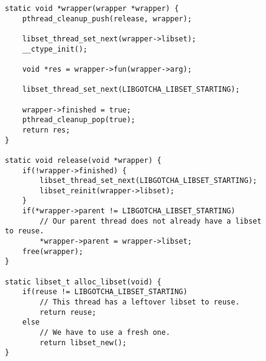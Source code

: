 \begin{figure}[p]
\begin{fullpage}
\begin{lstlisting}[label=lst:acsafe_helpers,caption=\textit{libac-safe}'s thread initializer and cleanup handler]
static void *wrapper(wrapper *wrapper) {
	pthread_cleanup_push(release, wrapper);

	libset_thread_set_next(wrapper->libset);
	__ctype_init();

	void *res = wrapper->fun(wrapper->arg);

	libset_thread_set_next(LIBGOTCHA_LIBSET_STARTING);

	wrapper->finished = true;
	pthread_cleanup_pop(true);
	return res;
}

static void release(void *wrapper) {
	if(!wrapper->finished) {
		libset_thread_set_next(LIBGOTCHA_LIBSET_STARTING);
		libset_reinit(wrapper->libset);
	}
	if(*wrapper->parent != LIBGOTCHA_LIBSET_STARTING)
		// Our parent thread does not already have a libset to reuse.
		*wrapper->parent = wrapper->libset;
	free(wrapper);
}

static libset_t alloc_libset(void) {
	if(reuse != LIBGOTCHA_LIBSET_STARTING)
		// This thread has a leftover libset to reuse.
		return reuse;
	else
		// We have to use a fresh one.
		return libset_new();
}
\end{lstlisting}
\end{fullpage}
\end{figure}

